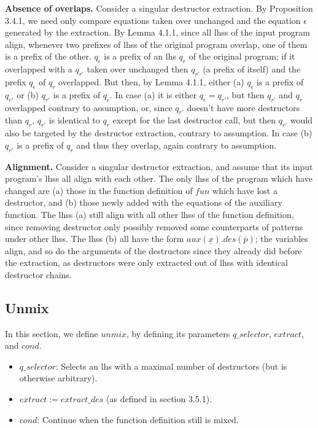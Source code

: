 \textbf{Absence of overlaps.} Consider a singular destructor extraction. By Proposition 3.4.1, we need only compare equations taken over unchanged and the equation $\epsilon$ generated by the extraction. By Lemma 4.1.1, since all lhss of the input program align, whenever two prefixes of lhss of the original program overlap, one of them is a prefix of the other. $q_\epsilon$ is a prefix of an lhs $q_r$ of the original program; if it overlapped with a $q_{r'}$ taken over unchanged then $q_{r'}$ (a prefix of itself) and the prefix $q_\epsilon$ of $q_r$ overlapped. But then, by Lemma 4.1.1, either (a) $q_\epsilon$ is a prefix of $q_{r'}$ or (b) $q_{r'}$ is a prefix of $q_\epsilon$. In case (a) it is either $q_\epsilon = q_{r'}$, but then $q_{r'}$ and $q_r$ overlapped contrary to assumption, or, since $q_{r'}$ doesn't have more destructors than $q_r$, $q_{r'}$ is identical to $q_r$ except for the last destructor call, but then $q_{r'}$ would also be targeted by the destructor extraction, contrary to assumption. In case (b) $q_{r'}$ is a prefix of $q_r$ and thus they overlap, again contrary to assumption.

\textbf{Alignment.} Consider a singular destructor extraction, and assume that its input program's lhss all align with each other. The only lhss of the program which have changed are (a) those in the function definition of $fun$ which have lost a destructor, and (b) those newly added with the equations of the auxiliary function. The lhss (a) still align with all other lhss of the function definition, since removing destructor only possibly removed some counterparts of patterns under other lhss. The lhss (b) all have the form $aux(\underline{x}).des(\overline{p})$; the variables align, and so do the arguments of the destructors since they already did before the extraction, as destructors were only extracted out of lhss with identical destructor chains.

\subsection{Unmix}

In this section, we define $unmix$, by defining its parameters $q\_selector$, $extract$, and $cond$.

\begin{itemize}
\item $q\_selector$: Selects an lhs with a maximal number of destructors (but is otherwise arbitrary).

\item $extract := extract\_des$ (as defined in section 3.5.1).

\item $cond$: Continue when the function definition still is mixed.
\end{itemize}


